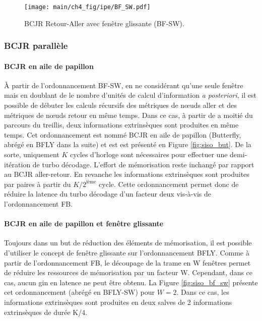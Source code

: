 \begin{figure}[!h]
	\centering
	\texttt{[image: main/ch4\_fig/ipe/BF\_SW.pdf]}
	\caption{BCJR Retour-Aller avec fenêtre glissante (BF-SW). \label{fig:siso_sw}}
\end{figure}

\subsubsection{BCJR parallèle}
\paragraph*{BCJR en aile de papillon}
À partir de l'ordonnancement BF-SW, en ne considérant qu'une seule fenêtre mais en doublant de le nombre d'unités de 
calcul d'information \textit{a posteriori}, il est possible de débuter les calculs récursifs des métriques de nœuds 
aller et des métriques de nœuds retour en même temps. Dans ce cas, à partir de a moitié du parcours du treillis, deux 
informations extrinsèques sont produites en même temps. Cet ordonnancement est nommé BCJR en aile de papillon (Butterfly, abrégé en BFLY dans 
la suite) \cite{butterfly} et est est présenté en Figure \ref{fig:siso_but}. De la sorte, uniquement $K$ cycles 
d'horloge sont nécessaires pour effectuer une demi-itération de turbo décodage. L'effort de mémorisation reste inchangé 
par rapport au BCJR aller-retour. En revanche les informations extrinsèques sont produites par paires à partir du $K/2^{\text{ième}}$ cycle. Cette ordonnancement permet donc de réduire la latence du turbo décodage d'un facteur deux vis-à-vis de l'ordonnancement FB.


\paragraph*{BCJR en aile de papillon et fenêtre glissante}
Toujours dans un but de réduction des éléments de mémorisation, il est possible d'utiliser le concept de fenêtre 
glissante sur l'ordonnancement BFLY. Comme à partir de l'ordonnancement FB, le découpage de la trame en W fenêtres permet de réduire les ressources de mémorisation par un facteur W. Cependant, dans ce cas, aucun gin en latence ne peut
être obtenu. La Figure \ref{fig:siso_bf_sw} présente cet ordonnancement (abrégé en BFLY-SW) pour $W = 2$. Dans ce cas, 
les informations extrinsèques sont produites en deux salves de 2 informations extrinsèques de durée K/4.

